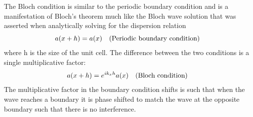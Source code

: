 \documentclass{article}
\begin{document}
The Bloch condition is similar to the periodic boundary condition and is a 
manifestation of Bloch's theorem much like the Bloch wave solution that was 
asserted when analytically solving for the dispersion relation
\begin{equation}
a(x+h) = a(x)\quad\textnormal{(Periodic boundary condition)}
\end{equation}
where h is the size of the unit cell. The difference between the two conditions 
is a single multiplicative factor:
\begin{equation}
a(x+h) = e^{ik_xh}a(x)\quad\textnormal{(Bloch condition)}
\end{equation}
The multiplicative factor in the boundary condition shifts is such that when 
the wave reaches a boundary it is phase shifted to match the wave at the 
opposite boundary such that there is no interference.
\end{document}
